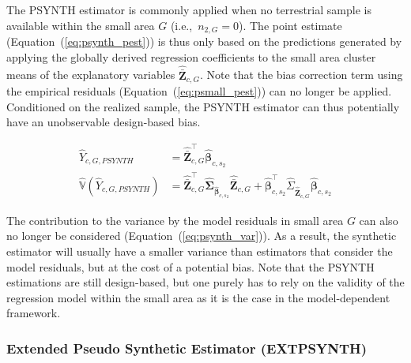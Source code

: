 \documentclass[remotesensing,article,accept,moreauthors,pdftex,10pt,a4paper]{Definitions/mdpi}
\newcommand{\psynth}{PSYNTH}
\newcommand{\extpsynth}{EXTPSYNTH}
\newcommand{\var}{\mathbb{V}}
\begin{document}
The \psynth{} estimator is commonly applied when no terrestrial sample is available within the small area $G$ (i.e.,~$n_{2,G} = 0$). The point estimate (Equation~(\ref{eq:psynth_pest})) is thus only based on the predictions generated by applying the globally derived regression coefficients to the small area cluster means of the explanatory variables $\hat{\bar{\pmb{Z}}}_{c,G}$. Note that the bias correction term using the empirical residuals (Equation~(\ref{eq:psmall_pest})) can no longer be applied. Conditioned on the realized sample, the \psynth{} estimator can thus potentially have an unobservable design-based bias.

\begin{subequations}\label{eq:psynth}
	\begin{align}
	\hat{Y}_{c,G,PSYNTH} &  = \hat{\bar{\pmb{Z}}}_{c,G}^{\top}\hat{\pmb{\beta}}_{c,s_2} \label{eq:psynth_pest} \\
	\hat{\var}(\hat{Y}_{c,G,PSYNTH})&  = 
	\hat{\bar{\pmb{Z}}}_{c,G}^{\top}\hat{\pmb{\Sigma}}_{\hat{\pmb{\beta}}_{c,s_2}}
	\hat{\bar{\pmb{Z}}}_{c,G}
	+ \hat{\pmb{\beta}}^{\top}_{c,s_2}\hat{\Sigma}_{\hat{\bar{\pmb{Z}}}_{c,G}}\hat{\pmb{\beta}}_{c,s_2} \label{eq:psynth_var}
	\end{align}
\end{subequations}

The contribution to the variance by the model residuals in small area $G$ can also no longer be considered (Equation~(\ref{eq:psynth_var})). As a result, the synthetic estimator will usually have a smaller variance than estimators that consider the model residuals, but at the cost of a potential bias. Note that the \psynth{} estimations are still design-based, but one purely has to rely on the validity of the regression model within the small area as it is the case in the model-dependent framework.

\subsubsection{Extended Pseudo Synthetic Estimator (\extpsynth{})}
\label{sec:extpsynth}
\end{document}
